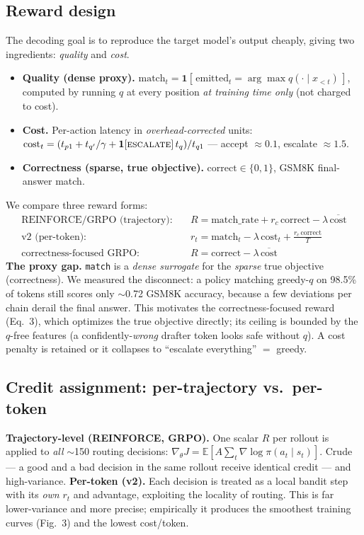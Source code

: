 \documentclass[11pt]{article}
\begin{document}
\subsection{Reward design}
The decoding goal is to reproduce the target model's output cheaply, giving two ingredients:
\emph{quality} and \emph{cost}.
\begin{itemize}\itemsep1pt
\item \textbf{Quality (dense proxy).} $\text{match}_t=\mathbf{1}[\,\text{emitted}_t=\arg\max q(\cdot\mid x_{<t})\,]$,
computed by running $q$ at every position \emph{at training time only} (not charged to cost).
\item \textbf{Cost.} Per-action latency in \emph{overhead-corrected} units:
$\text{cost}_t=(t_{p1}+t_{q'}/\gamma+\mathbf{1}[\textsc{escalate}]\,t_q)/t_{q1}$ --- accept $\approx0.1$,
escalate $\approx1.5$.
\item \textbf{Correctness (sparse, true objective).} $\text{correct}\in\{0,1\}$, GSM8K final-answer match.
\end{itemize}
We compare three reward forms:
\begin{align}
\text{REINFORCE/GRPO (trajectory):}\quad & R=\text{match\_rate}+r_c\,\text{correct}-\lambda\,\overline{\text{cost}} \\
\text{v2 (per-token):}\quad & r_t=\text{match}_t-\lambda\,\text{cost}_t+\tfrac{r_c\,\text{correct}}{T} \\
\text{correctness-focused GRPO:}\quad & R=\text{correct}-\lambda\,\overline{\text{cost}}
\end{align}
\textbf{The proxy gap.} \texttt{match} is a \emph{dense surrogate} for the \emph{sparse} true
objective (correctness). We measured the disconnect: a policy matching greedy-$q$ on 98.5\% of
tokens still scores only $\sim$0.72 GSM8K accuracy, because a few deviations per chain derail the
final answer. This motivates the correctness-focused reward (Eq.~3), which optimizes the true
objective directly; its ceiling is bounded by the $q$-free features (a confidently-\emph{wrong}
drafter token looks safe without $q$). A cost penalty is retained or it collapses to
``escalate everything'' $=$ greedy.

\subsection{Credit assignment: per-trajectory vs.\ per-token}
\textbf{Trajectory-level (REINFORCE, GRPO).} One scalar $R$ per rollout is applied to \emph{all}
$\sim$150 routing decisions: $\nabla_\theta J=\mathbb{E}[A\sum_t\nabla\log\pi(a_t\mid s_t)]$.
Crude --- a good and a bad decision in the same rollout receive identical credit --- and
high-variance.
\textbf{Per-token (v2).} Each decision is treated as a local bandit step with its \emph{own}
$r_t$ and advantage, exploiting the locality of routing. This is far lower-variance and more
precise; empirically it produces the smoothest training curves (Fig.~3) and the lowest cost/token.
\end{document}
